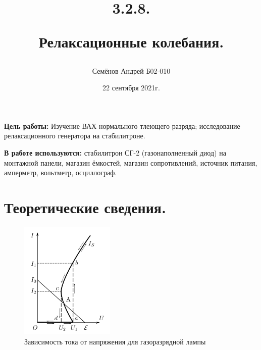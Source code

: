 \documentclass[a4paper,12pt]{article}
\begin{document}
\title{
3.2.8.

Релаксационные колебания.
\author{Семёнов Андрей Б02-010}
}
\date{22 сентября 2021г.}

\maketitle

\newpage

\textbf{Цель работы:} Изучение ВАХ нормального тлеющего разряда; исследование релаксационного генератора на стабилитроне.

\textbf{В работе используются:} стабилитрон СГ-2 (газонаполненный диод) на монтажной панели, магазин ёмкостей, магазин сопротивлений, источник питания, амперметр, вольтметр, осциллограф.

\section{Теоретические сведения.}

\begin{figure}
   		\includegraphics[width=0.4\textwidth]{plot}
    	\caption{Зависимость тока от напряжения для газоразрядной лампы }
    	\label{ris:plot}
\end{figure}
	
	
		
\end{document}
